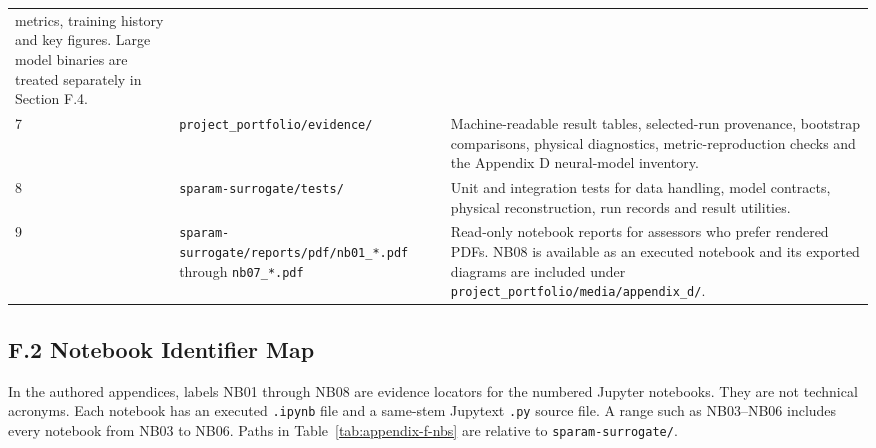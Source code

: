 \begin{table}[!htbp]
\begin{tabular}{@{}p{}p{}
                         p{}@{}}
            metrics, training history and key figures. Large model binaries are
            treated separately in Section F.4. \\
        7
          & \nolinkurl{project_portfolio/evidence/}
          & Machine-readable result tables, selected-run provenance, bootstrap
            comparisons, physical diagnostics, metric-reproduction checks and
            the Appendix D neural-model inventory. \\
        8
          & \nolinkurl{sparam-surrogate/tests/}
          & Unit and integration tests for data handling, model contracts,
            physical reconstruction, run records and result utilities. \\
        9
          & \nolinkurl{sparam-surrogate/reports/pdf/nb01_*.pdf} through
            \nolinkurl{nb07_*.pdf}
          & Read-only notebook reports for assessors who prefer rendered PDFs.
            NB08 is available as an executed notebook and its exported diagrams
            are included under \nolinkurl{project_portfolio/media/appendix_d/}.
            \\
        \bottomrule
    \end{tabular}
\end{table}

\clearpage
\PortfolioContentPageCommand
{}
{}
\subsection*{F.2 Notebook Identifier Map}
\label{app:f-notebooks}

In the authored appendices, labels NB01 through NB08 are evidence locators for
the numbered Jupyter notebooks. They are not technical acronyms. Each notebook
has an executed \nolinkurl{.ipynb} file and a same-stem Jupytext
\nolinkurl{.py} source file. A range such as NB03--NB06 includes every notebook
from NB03 to NB06.
Paths in Table~\ref{tab:appendix-f-nbs} are relative to
\nolinkurl{sparam-surrogate/}.

